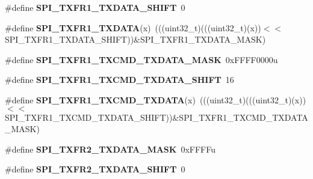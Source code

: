\begin{DoxyCompactItemize}
\item 
\#define {\bfseries S\+P\+I\+\_\+\+T\+X\+F\+R1\+\_\+\+T\+X\+D\+A\+T\+A\+\_\+\+S\+H\+I\+FT}~0\hypertarget{group__SPI__Register__Masks_ga15dd2d0a8568bc36fed73be8a4cb24a0}{}\label{group__SPI__Register__Masks_ga15dd2d0a8568bc36fed73be8a4cb24a0}

\item 
\#define {\bfseries S\+P\+I\+\_\+\+T\+X\+F\+R1\+\_\+\+T\+X\+D\+A\+TA}(x)~(((uint32\+\_\+t)(((uint32\+\_\+t)(x))$<$$<$S\+P\+I\+\_\+\+T\+X\+F\+R1\+\_\+\+T\+X\+D\+A\+T\+A\+\_\+\+S\+H\+I\+FT))\&S\+P\+I\+\_\+\+T\+X\+F\+R1\+\_\+\+T\+X\+D\+A\+T\+A\+\_\+\+M\+A\+SK)\hypertarget{group__SPI__Register__Masks_ga7f5fddb0dfde74876bf4b6ff4603dd56}{}\label{group__SPI__Register__Masks_ga7f5fddb0dfde74876bf4b6ff4603dd56}

\item 
\#define {\bfseries S\+P\+I\+\_\+\+T\+X\+F\+R1\+\_\+\+T\+X\+C\+M\+D\+\_\+\+T\+X\+D\+A\+T\+A\+\_\+\+M\+A\+SK}~0x\+F\+F\+F\+F0000u\hypertarget{group__SPI__Register__Masks_ga03437d9c36165cd76cc1b649bc61fdcd}{}\label{group__SPI__Register__Masks_ga03437d9c36165cd76cc1b649bc61fdcd}

\item 
\#define {\bfseries S\+P\+I\+\_\+\+T\+X\+F\+R1\+\_\+\+T\+X\+C\+M\+D\+\_\+\+T\+X\+D\+A\+T\+A\+\_\+\+S\+H\+I\+FT}~16\hypertarget{group__SPI__Register__Masks_ga0240ff4345642a5bca2308c670c5a980}{}\label{group__SPI__Register__Masks_ga0240ff4345642a5bca2308c670c5a980}

\item 
\#define {\bfseries S\+P\+I\+\_\+\+T\+X\+F\+R1\+\_\+\+T\+X\+C\+M\+D\+\_\+\+T\+X\+D\+A\+TA}(x)~(((uint32\+\_\+t)(((uint32\+\_\+t)(x))$<$$<$S\+P\+I\+\_\+\+T\+X\+F\+R1\+\_\+\+T\+X\+C\+M\+D\+\_\+\+T\+X\+D\+A\+T\+A\+\_\+\+S\+H\+I\+FT))\&S\+P\+I\+\_\+\+T\+X\+F\+R1\+\_\+\+T\+X\+C\+M\+D\+\_\+\+T\+X\+D\+A\+T\+A\+\_\+\+M\+A\+SK)\hypertarget{group__SPI__Register__Masks_ga7aee126ae71c905a5041e9313be0bbea}{}\label{group__SPI__Register__Masks_ga7aee126ae71c905a5041e9313be0bbea}

\item 
\#define {\bfseries S\+P\+I\+\_\+\+T\+X\+F\+R2\+\_\+\+T\+X\+D\+A\+T\+A\+\_\+\+M\+A\+SK}~0x\+F\+F\+F\+Fu\hypertarget{group__SPI__Register__Masks_ga5af82cbc997e329e1c914390f4a46ddf}{}\label{group__SPI__Register__Masks_ga5af82cbc997e329e1c914390f4a46ddf}

\item 
\#define {\bfseries S\+P\+I\+\_\+\+T\+X\+F\+R2\+\_\+\+T\+X\+D\+A\+T\+A\+\_\+\+S\+H\+I\+FT}~0\hypertarget{group__SPI__Register__Masks_ga563b2a2513ee7f9ba76d56405bfaa053}{}\label{group__SPI__Register__Masks_ga563b2a2513ee7f9ba76d56405bfaa053}


\end{DoxyCompactItemize}
